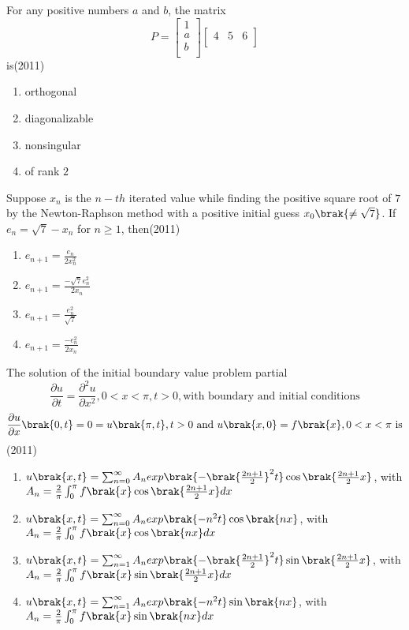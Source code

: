 \item For any positive numbers $a$ and $b$, the matrix $$P=\begin{bmatrix}
1\\a\\b\\
\end{bmatrix}
\begin{bmatrix}
4&5&6\\
\end{bmatrix}$$ is\hfill(2011)
\begin{multicols}{2}
\begin{enumerate}
\item orthogonal
\item diagonalizable
\item nonsingular
\item of rank $2$
\end{enumerate}
\end{multicols}


\item Suppose $x_{n}$ is the $n-th$ iterated value while finding the positive square root of $7$ by the Newton-Raphson method with a positive initial guess $x_{0}\brak{\neq \sqrt{7}}$. If $e_{n}=\sqrt{7}-x_{n}$ for $n\geq 1$, then\hfill(2011)
\begin{multicols}{2}
\begin{enumerate}
\item $e_{n+1}=\frac{e_{n}}{2x_{n}^{2}}$
\item $e_{n+1}=\frac{-\sqrt{7}e_{n}^{2}}{2x_{n}}$
\item $e_{n+1}=\frac{e_{n}^{2}}{\sqrt{7}}$
\item $e_{n+1}=\frac{-e_{n}^{2}}{2x_{n}}$
\end{enumerate}
\end{multicols}

\item The solution of the initial boundary value problem partial $$\frac{\partial u}{\partial t}=\frac{\partial^{2}u}{\partial x^{2}},0<x<\pi,t>0,\text{with boundary and initial conditions}$$ $$\frac{\partial u}{\partial x}\brak{0,t}=0=u\brak{\pi,t},t>0\text{ and }u\brak{x,0}=f\brak{x},0<x<\pi\text{ is}$$\hfill(2011)
\begin{enumerate}
\item $u\brak{x,t}=\sum_{n=0}^{\infty}A_{n}exp\brak{-\brak{\frac{2n+1}{2}}^{2}t}\cos{\brak{\frac{2n+1}{2}x}}$, with $A_{n}=\frac{2}{\pi}\int_{0}^{\pi}f\brak{x}\cos{\brak{\frac{2n+1}{2}x}}dx$
\item $u\brak{x,t}=\sum_{n=0}^{\infty}A_{n}exp\brak{-n^{2}t}\cos{\brak{nx}}$, with $A_{n}=\frac{2}{\pi}\int_{0}^{\pi}f\brak{x}\cos{\brak{nx}}dx$
\item $u\brak{x,t}=\sum_{n=1}^{\infty}A_{n}exp\brak{-\brak{\frac{2n+1}{2}}^{2}t}\sin{\brak{\frac{2n+1}{2}x}}$, with $A_{n}=\frac{2}{\pi}\int_{0}^{\pi}f\brak{x}\sin{\brak{\frac{2n+1}{2}x}}dx$
\item $u\brak{x,t}=\sum_{n=1}^{\infty}A_{n}exp\brak{-n^{2}t}\sin{\brak{nx}}$, with $A_{n}=\frac{2}{\pi}\int_{0}^{\pi}f\brak{x}\sin{\brak{nx}}dx$
\end{enumerate}

